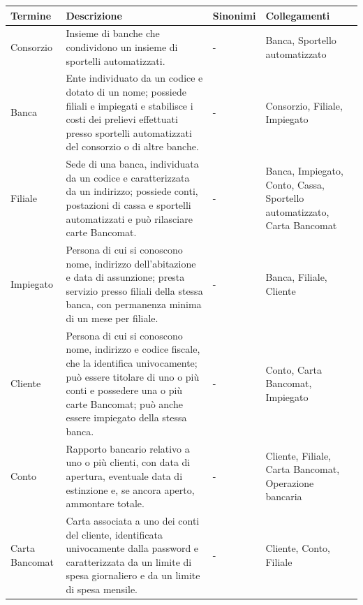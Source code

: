 \begin{table}[H]
  \centering
  \footnotesize
  \renewcommand{\arraystretch}{1.0}
  \setlength{\tabcolsep}{3pt}
  \begin{tabularx}{\textwidth}{@{}
      >{\raggedright\arraybackslash}p{2.3cm}
      >{\raggedright\arraybackslash}X
      >{\raggedright\arraybackslash}p{2.6cm}
      >{\raggedright\arraybackslash}p{3.2cm}
    @{}}
    \toprule
    \textbf{Termine} & \textbf{Descrizione} & \textbf{Sinonimi} & \textbf{Collegamenti} \\
    \midrule
    Consorzio & Insieme di banche che condividono un insieme di sportelli automatizzati. & - & Banca, Sportello automatizzato \\
    \midrule

    Banca & Ente individuato da un codice e dotato di un nome; possiede filiali e impiegati e stabilisce i costi dei prelievi effettuati presso sportelli automatizzati del consorzio o di altre banche. & - & Consorzio, Filiale, Impiegato \\
    \midrule

    Filiale & Sede di una banca, individuata da un codice e caratterizzata da un indirizzo; possiede conti, postazioni di cassa e sportelli automatizzati e può rilasciare carte Bancomat. & - & Banca, Impiegato, Conto, Cassa, Sportello automatizzato, Carta Bancomat \\
    \midrule

    Impiegato & Persona di cui si conoscono nome, indirizzo dell'abitazione e data di assunzione; presta servizio presso filiali della stessa banca, con permanenza minima di un mese per filiale. & - & Banca, Filiale, Cliente \\
    \midrule

    Cliente & Persona di cui si conoscono nome, indirizzo e codice fiscale, che la identifica univocamente; può essere titolare di uno o più conti e possedere una o più carte Bancomat; può anche essere impiegato della stessa banca. & - & Conto, Carta Bancomat, Impiegato \\
    \midrule

    Conto & Rapporto bancario relativo a uno o più clienti, con data di apertura, eventuale data di estinzione e, se ancora aperto, ammontare totale. & - & Cliente, Filiale, Carta Bancomat, Operazione bancaria \\
    \midrule

    Carta Bancomat & Carta associata a uno dei conti del cliente, identificata univocamente dalla password e caratterizzata da un limite di spesa giornaliero e da un limite di spesa mensile. & - & Cliente, Conto, Filiale \\
    \midrule


\end{tabularx}
\end{table}
